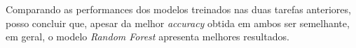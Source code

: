 Comparando as performances dos modelos treinados nas duas tarefas anteriores, posso concluir que, apesar da melhor \textit{accuracy} obtida em ambos ser semelhante, em geral, o modelo \textit{Random Forest} apresenta melhores resultados.
